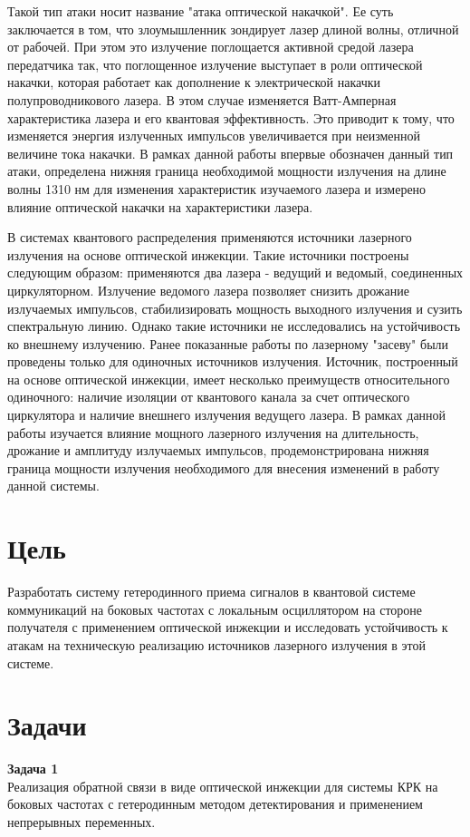 Такой тип атаки носит название "атака оптической накачкой". Ее суть заключается в том, что злоумышленник зондирует лазер длиной волны, отличной от рабочей. При этом это излучение поглощается активной средой лазера передатчика так, что поглощенное излучение выступает в роли оптической накачки, которая работает как дополнение к электрической накачки полупроводникового лазера. В этом случае изменяется Ватт-Амперная характеристика лазера и его квантовая эффективность. Это приводит к тому, что изменяется энергия излученных импульсов увеличивается при неизменной величине тока накачки. В рамках данной работы впервые обозначен данный тип атаки, определена нижняя граница необходимой мощности излучения на длине волны 1310 нм для изменения характеристик изучаемого лазера и измерено влияние оптической накачки на характеристики лазера. 

В системах квантового распределения применяются источники лазерного излучения на основе оптической инжекции. Такие источники построены следующим образом: применяются два лазера - ведущий и ведомый, соединенных циркуляторном. Излучение ведомого лазера позволяет снизить дрожание излучаемых импульсов, стабилизировать мощность выходного излучения и сузить спектральную линию. Однако такие источники не исследовались на устойчивость ко внешнему излучению. Ранее показанные работы по лазерному "засеву" были проведены только для одиночных источников излучения. Источник, построенный на основе оптической инжекции, имеет несколько преимуществ относительного одиночного: наличие изоляции от квантового канала за счет оптического циркулятора и наличие внешнего излучения ведущего лазера. В рамках данной работы изучается влияние мощного лазерного излучения на длительность, дрожание и амплитуду излучаемых импульсов, продемонстрирована нижняя граница мощности излучения необходимого  для внесения изменений в работу данной системы.
\section*{Цель}
Разработать систему гетеродинного приема сигналов в квантовой системе коммуникаций на боковых частотах с локальным осциллятором на стороне получателя с применением оптической инжекции и исследовать устойчивость к атакам на техническую реализацию источников лазерного излучения в этой системе. 

\section*{Задачи}
\textbf{Задача 1}\\
Реализация обратной связи в виде оптической инжекции для системы КРК на боковых частотах с гетеродинным методом детектирования и применением непрерывных переменных. 

